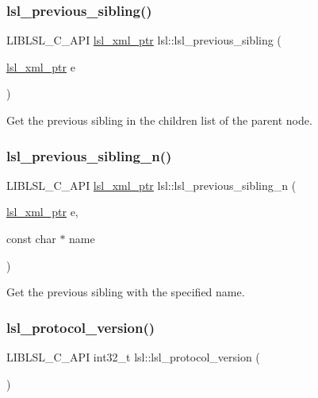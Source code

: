 \subsubsection{\texorpdfstring{lsl\+\_\+previous\+\_\+sibling()}{lsl\_previous\_sibling()}}
{\footnotesize\ttfamily L\+I\+B\+L\+S\+L\+\_\+\+C\+\_\+\+A\+PI \hyperlink{namespacelsl_a5edc7a49a1a1be1634fe6dce3d59c59b}{lsl\+\_\+xml\+\_\+ptr} lsl\+::lsl\+\_\+previous\+\_\+sibling (\begin{DoxyParamCaption}\item[{\hyperlink{namespacelsl_a5edc7a49a1a1be1634fe6dce3d59c59b}{lsl\+\_\+xml\+\_\+ptr}}]{e }\end{DoxyParamCaption})}

Get the previous sibling in the children list of the parent node. \mbox{\label{namespacelsl_a1b42f95654ea48c92a15bd077e6c73ac}} 
\subsubsection{\texorpdfstring{lsl\+\_\+previous\+\_\+sibling\+\_\+n()}{lsl\_previous\_sibling\_n()}}
{\footnotesize\ttfamily L\+I\+B\+L\+S\+L\+\_\+\+C\+\_\+\+A\+PI \hyperlink{namespacelsl_a5edc7a49a1a1be1634fe6dce3d59c59b}{lsl\+\_\+xml\+\_\+ptr} lsl\+::lsl\+\_\+previous\+\_\+sibling\+\_\+n (\begin{DoxyParamCaption}\item[{\hyperlink{namespacelsl_a5edc7a49a1a1be1634fe6dce3d59c59b}{lsl\+\_\+xml\+\_\+ptr}}]{e,  }\item[{const char $\ast$}]{name }\end{DoxyParamCaption})}

Get the previous sibling with the specified name. \mbox{\label{namespacelsl_a9695264d0e763474d352767702b38222}} 
\subsubsection{\texorpdfstring{lsl\+\_\+protocol\+\_\+version()}{lsl\_protocol\_version()}}
{\footnotesize\ttfamily L\+I\+B\+L\+S\+L\+\_\+\+C\+\_\+\+A\+PI int32\+\_\+t lsl\+::lsl\+\_\+protocol\+\_\+version (\begin{DoxyParamCaption}{ }\end{DoxyParamCaption})}

